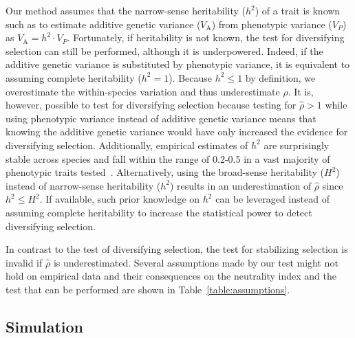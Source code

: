 \documentclass{article}
\newcommand{\Multiply}{\cdot}
\newcommand{\Trait}{P}
\newcommand{\Heritability}{h^2}
\newcommand{\VarPhenotype}{V_{\Trait}}
\newcommand{\VarGenetic}{V_{\mathrm{A}}}
\newcommand{\EstNI}{\widehat{\rho}}
\begin{document}
Our method assumes that the narrow-sense heritability ($\Heritability$) of a trait is known such as to estimate additive genetic variance ($\VarGenetic$) from phenotypic variance ($\VarPhenotype$) as $\VarGenetic = \Heritability \Multiply \VarPhenotype$.
Fortunately, if heritability is not known, the test for diversifying selection can still be performed, although it is underpowered.
Indeed, if the additive genetic variance is substituted by phenotypic variance, it is equivalent to assuming complete heritability ($\Heritability = 1$).
Because $\Heritability \leq 1$ by definition, we overestimate the within-species variation and thus underestimate $\EstNI$.
It is, however, possible to test for diversifying selection because testing for $\EstNI > 1$ while using phenotypic variance instead of additive genetic variance means that knowing the additive genetic variance would have only increased the evidence for diversifying selection.
Additionally, empirical estimates of $\Heritability$ are surprisingly stable across species and fall within the range of 0.2-0.5 in a vast majority of phenotypic traits tested~\citep{hansen_heritability_2011, hansen_evolvability_2021}.
Alternatively, using the broad-sense heritability ($H^2$) instead of narrow-sense heritability ($\Heritability$) results in an underestimation of $\EstNI$ since $\Heritability \leq H^2$.
If available, such prior knowledge on $\Heritability$ can be leveraged instead of assuming complete heritability to increase the statistical power to detect diversifying selection.

In contrast to the test of diversifying selection, the test for stabilizing selection is invalid if $\EstNI$ is underestimated.
Several assumptions made by our test might not hold on empirical data and their consequences on the neutrality index and the test that can be performed are shown in Table~\ref{table:assumptions}.

\subsection*{Simulation}\label{subsec:simulations}
\end{document}
